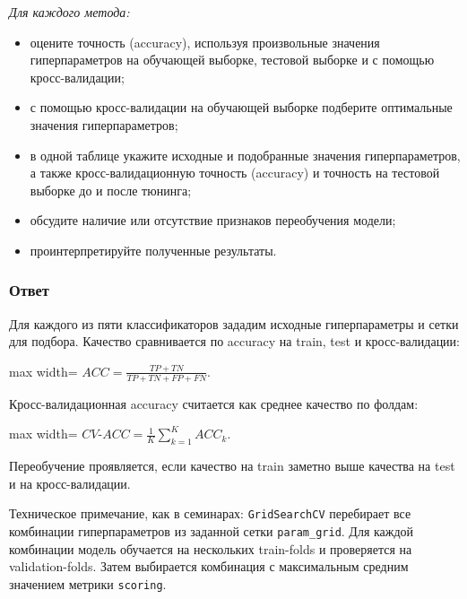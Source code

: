 \documentclass[11pt]{article}
\newenvironment{tasktext}
      {\begin{tcolorbox}[breakable, colback=black!3, colframe=black!28,
        boxrule=0.4pt, arc=1.5mm, left=7pt, right=7pt, top=5pt, bottom=5pt,
        before skip=0.35em, after skip=0.75em]\itshape}
      {\end{tcolorbox}}
\providecommand{\tightlist}{%
      \setlength{\itemsep}{0pt}\setlength{\parskip}{0pt}}
\begin{document}
\begin{tasktext}
Для каждого метода:

\begin{itemize}
\tightlist
\item
  оцените точность (accuracy), используя произвольные значения
  гиперпараметров на обучающей выборке, тестовой выборке и с помощью
  кросс-валидации;
\item
  с помощью кросс-валидации на обучающей выборке подберите оптимальные
  значения гиперпараметров;
\item
  в одной таблице укажите исходные и подобранные значения
  гиперпараметров, а также кросс-валидационную точность (accuracy) и
  точность на тестовой выборке до и после тюнинга;
\item
  обсудите наличие или отсутствие признаков переобучения модели;
\item
  проинтерпретируйте полученные результаты.
\end{itemize}
\end{tasktext}

\subsubsection{Ответ}

Для каждого из пяти классификаторов зададим исходные гиперпараметры и
сетки для подбора. Качество сравнивается по accuracy на train, test и
кросс-валидации:

\begin{center}
\begin{adjustbox}{max width=\linewidth}
\(\displaystyle ACC = \frac{TP + TN}{TP + TN + FP + FN}.\)
\end{adjustbox}
\end{center}

Кросс-валидационная accuracy считается как среднее качество по фолдам:

\begin{center}
\begin{adjustbox}{max width=\linewidth}
\(\displaystyle CV\text{-}ACC = \frac{1}{K}\sum_{k=1}^{K} ACC_k.\)
\end{adjustbox}
\end{center}

Переобучение проявляется, если качество на train заметно выше качества
на test и на кросс-валидации.

    Техническое примечание, как в семинарах: \texttt{GridSearchCV}
перебирает все комбинации гиперпараметров из заданной сетки
\texttt{param\_grid}. Для каждой комбинации модель обучается на
нескольких train-folds и проверяется на validation-folds. Затем
выбирается комбинация с максимальным средним значением метрики
\texttt{scoring}.
\end{document}
